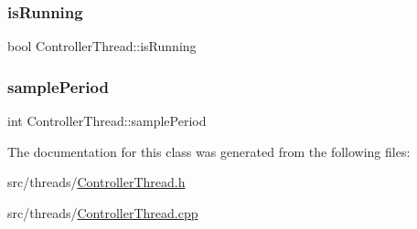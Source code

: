 \subsubsection{\texorpdfstring{is\+Running}{isRunning}}
{\footnotesize\ttfamily bool Controller\+Thread\+::is\+Running\hspace{0.3cm}{\ttfamily [private]}}

\mbox{\label{classControllerThread_a5dcd0069c7d31295c7e1e598c31fadf7}} 
\subsubsection{\texorpdfstring{sample\+Period}{samplePeriod}}
{\footnotesize\ttfamily int Controller\+Thread\+::sample\+Period\hspace{0.3cm}{\ttfamily [private]}}



The documentation for this class was generated from the following files\+:\begin{DoxyCompactItemize}
\item 
src/threads/\hyperlink{ControllerThread_8h}{Controller\+Thread.\+h}\item 
src/threads/\hyperlink{ControllerThread_8cpp}{Controller\+Thread.\+cpp}\end{DoxyCompactItemize}
